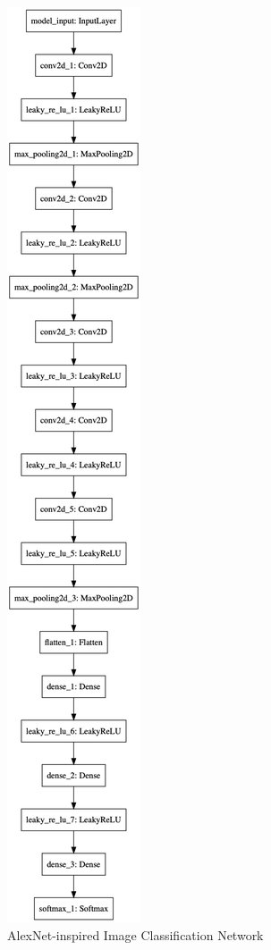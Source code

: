 \begin{figure}
    \centering
    \begin{center}
        \includegraphics[height=0.9\textheight]{images/alexnet/model.png}
    \end{center}
    \caption[AlexNet Network]{AlexNet-inspired Image Classification Network}
    \label{fig:alexnet}
\end{figure}

